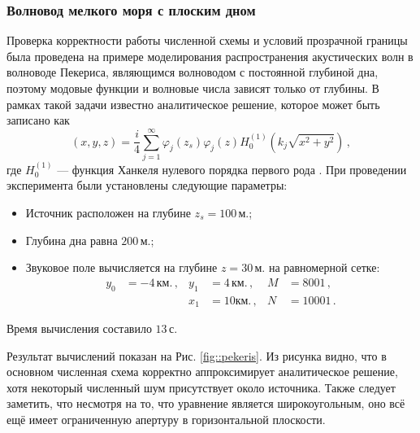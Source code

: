 \documentclass{fefu}
\newcommand{\pa}[1]{\left(#1\right)}
\begin{document}
            \subsubsection{Волновод мелкого моря с плоским дном}
                \par Проверка корректности работы численной схемы и условий прозрачной границы была проведена на примере моделирования распространения акустических волн в волноводе Пекериса, являющимся волноводом с постоянной глубиной дна, поэтому модовые функции и волновые числа зависят только от глубины. В рамках такой задачи известно аналитическое решение, которое может быть записано как \cite{jensen}
                \begin{equation}
                    \pa{x,y,z}=\frac{i}{4}\sum\limits_{j=1}^\infty\varphi_j\pa{z_s}\varphi_j\pa{z}H_0^{\pa{1}}\pa{k_j\sqrt{x^2+y^2}}\,,
                \end{equation}
                где $H_0^{\pa{1}}$ --- функция Ханкеля нулевого порядка первого рода \cite{hankel}. При проведении эксперимента были установлены следующие параметры:
                \begin{itemize}
                    \item Источник расположен на глубине $z_s=100\,\text{м.}$;
                    \item Глубина дна равна $200\,\text{м.}$;
                    \item Звуковое поле вычисляется на глубине $z=30\,\text{м.}$ на равномерной сетке:
                        \begin{equation}
                            \begin{aligned}
                                y_0&=-4\,\text{км.}\,,&y_1&=4\,\text{км.}\,,&M&=8001\,,\\
                                &&x_1&=10\text{км.}\,,&N&=10001\,.
                            \end{aligned}
                        \end{equation}
                \end{itemize}
                Время вычисления составило $13\,\text{с.}$
                \par Результат вычислений показан на Рис. \ref{fig::pekeris}. Из рисунка видно, что в основном численная схема корректно аппроксимирует аналитическое решение, хотя некоторый численный шум присутствует около источника. Также следует заметить, что несмотря на то, что уравнение является широкоугольным, оно всё ещё имеет ограниченную апертуру в горизонтальной плоскости. 
\end{document}

